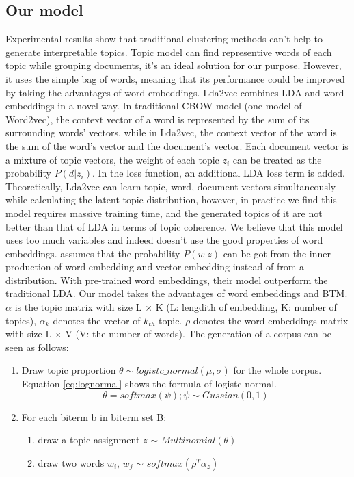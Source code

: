 \subsection{Our model}
\label{sec:modeling}
Experimental results show that traditional clustering methods can't help to generate interpretable topics.
Topic model can find representive words of each topic while grouping documents, it's an ideal solution for our purpose. However, it uses the simple bag of words, meaning that its performance could be improved by taking the advantages of word embeddings. Lda2vec \cite{moody2016mixing} combines LDA and word embeddings in a novel way. In traditional CBOW model (one model of Word2vec), the context vector of a word is represented by the sum of its surrounding words' vectors, while in Lda2vec, the context vector of the word is the sum of the word's vector and the document's vector. Each document vector is a mixture of topic vectors, the weight of each topic $z_i$ can be treated as the probability $P(d|z_i)$. In the loss function, an additional LDA loss term is added. Theoretically, Lda2vec can learn topic, word, document vectors simultaneously while calculating the latent topic distribution, however, in practice we find this model requires massive training time, and the generated topics of it are not better than that of LDA in terms of topic coherence. We believe that this model uses too much variables and indeed doesn't use the good properties of word embeddings. \cite{dieng2019topic} assumes that the probability $P(w|z)$ can be got from the inner production of word embedding and vector embedding instead of from a distribution. With pre-trained word embeddings, their model outperform the traditional LDA. Our model takes the advantages of word embeddings and BTM. $\alpha$ is the topic matrix with size L $\times$ K (L: lengdith of embedding, K: number of topics), $\alpha_k$ denotes the vector of $k_{th}$ topic. $\rho$ denotes the word embeddings matrix with size L $\times$ V (V: the number of words). The generation of a corpus can be seen as follows:
\begin{enumerate}
    \item Draw topic proportion $\theta \sim logistc\_normal(\mu, \sigma)$ for the whole corpus. Equation \ref{eq:lognormal} shows the formula of logistc normal.
    \begin{equation}
        \theta=softmax(\psi); \psi \sim Gussian(0,1)
        \label{eq:lognormal}
    \end{equation}
    \item For each biterm b in biterm set B:
    \begin{enumerate}
        \item  draw a topic assignment $z$ $\sim$ $Multinomial(\theta)$
        \item draw two words $w_i$, $w_j$ $\sim$ $softmax(\rho^T\alpha_z)$ 
    \end{enumerate}
\end{enumerate} 
